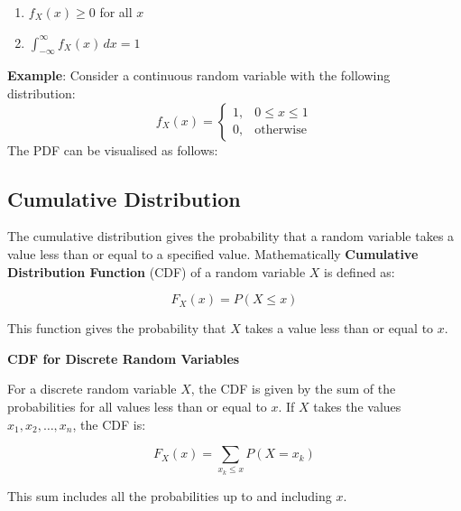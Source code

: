 \documentclass[twoside]{book}
\begin{document}
\begin{enumerate}
    \item \( f_X(x) \geq 0 \) for all \( x \)
    \item \( \int_{-\infty}^{\infty} f_X(x) \, dx = 1 \)
\end{enumerate}

\textbf{Example}: Consider a continuous random variable with the following distribution:
\[
f_X(x) = 
\begin{cases}
1, & 0 \leq x \leq 1 \\
0, & \text{otherwise}
\end{cases}
\]
The PDF can be visualised as follows:


\begin{center}
\end{center}

\subsection{Cumulative Distribution}

The cumulative distribution gives the probability that a random variable takes a value less than or equal to a specified value. Mathematically \textbf{Cumulative Distribution Function} (CDF) of a random variable \( X \) is defined as:
\begin{textbox}
    \[
F_X(x) = P(X \leq x)
\]
\end{textbox}
This function gives the probability that \( X \) takes a value less than or equal to \( x \).

\textbf{CDF for Discrete Random Variables}

For a discrete random variable \( X \), the CDF is given by the sum of the probabilities for all values less than or equal to \( x \). If \( X \) takes the values \( x_1, x_2, \dots, x_n \), the CDF is:
\begin{textbox}
\[
F_X(x) = \sum_{x_k \leq x} P(X = x_k)
\]
\end{textbox}
This sum includes all the probabilities up to and including \( x \).
\end{document}
